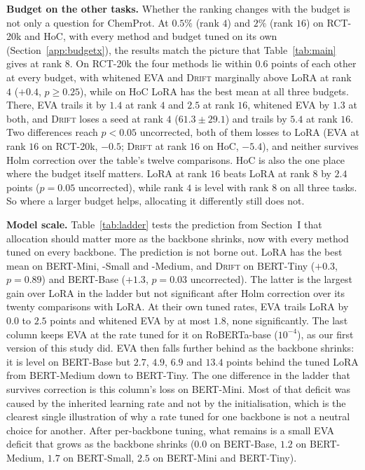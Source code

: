 \documentclass[conference,onecolumn]{IEEEtran}
\newcommand{\method}{\textsc{Drift}}
\begin{document}
\noindent\textbf{Budget on the other tasks.} Whether the ranking changes with the
budget is not only a question for ChemProt. At $0.5\%$ (rank $4$) and $2\%$
(rank $16$) on RCT-20k and HoC, with every method and budget tuned on its own
(Section~\ref{app:budgetx}), the results match the picture that
Table~\ref{tab:main} gives at rank $8$. On RCT-20k the four methods lie within
$0.6$ points of each other at every budget, with whitened EVA and \method{}
marginally above LoRA at rank $4$ ($+0.4$, $p \ge 0.25$), while on HoC LoRA has
the best mean at all three budgets. There, EVA trails it by $1.4$ at rank $4$
and $2.5$ at rank $16$, whitened EVA by $1.3$ at both, and \method{} loses a
seed at rank $4$ ($61.3\pm29.1$) and trails by $5.4$ at rank $16$. Two
differences reach $p < 0.05$ uncorrected, both of them losses to LoRA (EVA at
rank $16$ on RCT-20k, $-0.5$; \method{} at rank $16$ on HoC, $-5.4$), and
neither survives Holm correction over the table's twelve comparisons. HoC is
also the one place where the budget itself matters. LoRA at rank $16$ beats LoRA
at rank $8$ by $2.4$ points ($p = 0.05$ uncorrected), while rank $4$ is level
with rank $8$ on all three tasks. So where a larger budget helps, allocating it
differently still does not.

\noindent\textbf{Model scale.} Table~\ref{tab:ladder} tests the prediction from
Section~I that allocation should matter more as the backbone shrinks, now with
every method tuned on every backbone. The prediction is not borne out. LoRA has
the best mean on BERT-Mini, -Small and -Medium, and \method{} on BERT-Tiny
($+0.3$, $p = 0.89$) and BERT-Base ($+1.3$, $p = 0.03$ uncorrected). The latter
is the largest gain over LoRA in the ladder but not significant after Holm
correction over its twenty comparisons with LoRA. At their own tuned rates, EVA
trails LoRA by $0.0$ to $2.5$ points and whitened EVA by at most $1.8$, none
significantly. The last column keeps EVA at the rate tuned for it on
RoBERTa-base ($10^{-4}$), as our first version of this study did. EVA then
falls further behind as the backbone shrinks: it is level on BERT-Base but
$2.7$, $4.9$, $6.9$ and $13.4$ points behind the tuned LoRA from BERT-Medium
down to BERT-Tiny. The one difference in the ladder
that survives correction is this column's loss on BERT-Mini. Most of that
deficit was caused by the inherited learning rate and not by the
initialisation, which is the clearest single illustration of why a rate tuned
for one backbone is not a neutral choice for another. After per-backbone tuning,
what remains is a small EVA deficit that grows as the backbone shrinks ($0.0$ on
BERT-Base, $1.2$ on BERT-Medium, $1.7$ on BERT-Small, $2.5$ on BERT-Mini and
BERT-Tiny).
\end{document}
